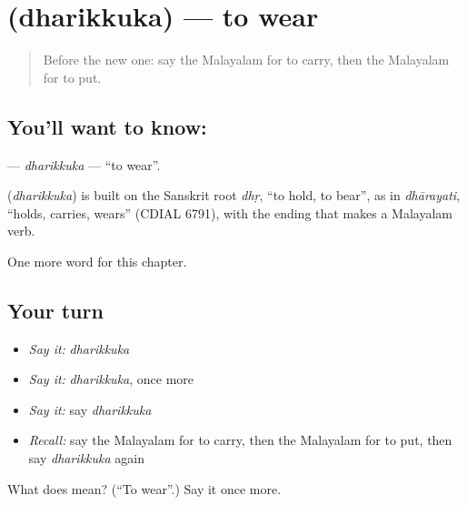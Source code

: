 \section[\texorpdfstring{\ml{ധരിക്കുക} (dharikkuka)}{ധരിക്കുക (dharikkuka)}]{ (dharikkuka) — to wear}

\label{lesson:ML-C223-dharikkuka}



\begin{quote}
Before the new one: say the Malayalam for to carry, then the Malayalam for to put.
\end{quote}

\subsection*{You'll want to know: }
\textbf{} — \emph{dharikkuka} — \textquotedblleft{}to wear\textquotedblright{}.

\begin{cousinweb}
\textbf{} (\emph{dharikkuka}) is built on the Sanskrit root \emph{dhṛ}, \textquotedblleft{}to hold, to bear\textquotedblright{}, as in \emph{dhārayati}, \textquotedblleft{}holds, carries, wears\textquotedblright{} (CDIAL 6791), with the ending that makes a Malayalam verb.
\end{cousinweb}

\begin{grammarlens}[title={What you've built}]
One more word for this chapter.
\end{grammarlens}

\subsection*{Your turn}
\begin{itemize}
\raggedright
  \item \emph{Say it:} \emph{dharikkuka}
  \item \emph{Say it:} \emph{dharikkuka}, once more
  \item \emph{Say it:} say \emph{dharikkuka}
  \item \emph{Recall:} say the Malayalam for to carry, then the Malayalam for to put, then say \emph{dharikkuka} again
\end{itemize}

\begin{tcolorbox}[breakable,colback=teal!4,colframe=teal!35!black,title={Before you move on}]
What does  mean? (\textquotedblleft{}To wear\textquotedblright{}.) Say it once more.
\end{tcolorbox}
